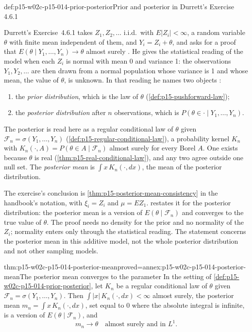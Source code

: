 \begin{hbexample}{def:p15-w02c-p15-014-prior-posterior}{Prior and posterior in Durrett's Exercise 4.6.1}
\par\nobreak
Durrett's Exercise~4.6.1 takes \(Z_1,Z_2,\ldots\) i.i.d.\ with
\(E|Z_i|<\infty\), a random variable \(\theta\) with finite mean
independent of them, and \(Y_i=Z_i+\theta\), and asks for a proof that
\(E(\theta\mid Y_1,\ldots,Y_n)\to\theta\) almost surely
\cite[Exercise~4.6.1, p.~248]{DurrettPTEAuthor2019}. He gives the
statistical reading of the model when each \(Z_i\) is normal with mean
0 and variance 1: the observations \(Y_1,Y_2,\ldots\) are then drawn
from a normal population whose variance is 1 and whose mean, the value
of \(\theta\), is unknown. In that reading he names two objects
\cite[p.~248]{DurrettPTEAuthor2019}:
\begin{enumerate}
\item the \emph{prior distribution}, which is the law of \(\theta\)
      (\cref{def:p15-pushforward-law});
\item the \emph{posterior distribution} after \(n\) observations, which
      is \(P(\theta\in\cdot\mid Y_1,\ldots,Y_n)\).
\end{enumerate}
The posterior is read here as a regular conditional law of \(\theta\)
given \(\mathcal F_n=\sigma(Y_1,\ldots,Y_n)\)
(\cref{def:p15-regular-conditional-law}), a probability kernel
\(K_n\) with \(K_n(\cdot,A)=P(\theta\in A\mid\mathcal F_n)\) almost surely
for every Borel \(A\). One exists because \(\theta\) is real
(\cref{thm:p15-real-conditional-law}), and any two agree outside one
null set. The \emph{posterior mean} is
\(\int x\,K_n(\cdot,dx)\), the mean of the posterior distribution.

The exercise's conclusion is \cref{thm:p15-posterior-mean-consistency}
in the handbook's notation, with \(\xi_i=Z_i\) and \(\mu=EZ_1\).
 restates it for the posterior
distribution: the posterior mean is a version of
\(E(\theta\mid\mathcal F_n)\) and converges to the true value of
\(\theta\). The proof needs no density for the prior and no normality of
the \(Z_i\); normality enters only through the statistical reading. The
statement concerns the posterior mean in this additive model, not the
whole posterior distribution and not other sampling models.
\end{hbexample}

\begin{hbcorollary}{thm:p15-w02c-p15-014-posterior-mean}{proved=annex:p15-w02c-p15-014-posterior-mean}{The posterior mean converges to the parameter}
In the setting of \cref{def:p15-w02c-p15-014-prior-posterior}, let
\(K_n\) be a regular conditional law of \(\theta\) given
\(\mathcal F_n=\sigma(Y_1,\ldots,Y_n)\). Then
\(\int|x|\,K_n(\cdot,dx)<\infty\) almost surely, the posterior mean
\(m_n=\int x\,K_n(\cdot,dx)\), set equal to 0 where the absolute integral
is infinite, is a version of \(E(\theta\mid\mathcal F_n)\), and
\[
 m_n\to\theta\quad\text{almost surely and in }L^1 .
\]
\end{hbcorollary}

